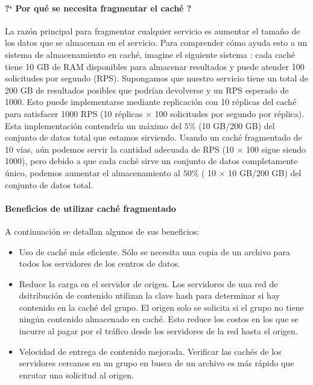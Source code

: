   \paragraph{?` Por qu\'e se necesita fragmentar el caché ?}
  La razón principal para fragmentar cualquier servicio es aumentar el tamaño de los datos que se almacenan en el servicio.
   Para comprender cómo ayuda esto a un sistema de almacenamiento en caché, imagine el siguiente sistema \cite{Burns2018}: cada caché tiene 10 GB de RAM disponibles para almacenar resultados y puede atender 100 solicitudes por segundo (RPS). Supongamos   que nuestro servicio tiene un total de 200 GB de resultados posibles que podrían devolverse y un RPS esperado de 1000. Esto puede implementarse mediante  replicaci\'on con  10 réplicas del caché para satisfacer 1000 RPS (10 réplicas × 100 solicitudes por segundo por réplica). Esta implementaci\'on contendr\'ia  un máximo del $5\%$    (10 GB/200 GB) del conjunto de datos total que estamos sirviendo. 
   Usando un caché   fragmentado de 10 vías, aún podemos servir la cantidad adecuada de RPS (10 × 100 sigue siendo 1000), pero debido a que cada caché sirve un conjunto de datos completamente único, podemos aumentar el almacenamiento al $50\% $ ( 10 × 10 GB/200 GB) del conjunto de datos total. 
   
   \paragraph{Beneficios de utilizar caché fragmentado }
   
    A continuación se detallan algunos de sus beneficios:
    
    \begin{itemize}
    	\item  Uso de caché más eficiente. Sólo se necesita una copia de un archivo para todos los servidores de los centros de datos. 
    	\item Reduce la carga en el servidor de origen. Los servidores de una red de dsitribuci\'on de contenido utilizan la clave hash para determinar si hay contenido en la caché del grupo. El origen solo se solicita si el grupo no tiene ningún contenido almacenado en caché. Esto reduce los costos en los que se incurre al pagar por el tráfico desde los servidores de la red hasta el origen. 
    	\item Velocidad de entrega de contenido mejorada. Verificar las cachés de los servidores cercanos en un grupo en busca de un archivo es más rápido que enrutar una solicitud al origen. 
    	
    \end{itemize}
    
